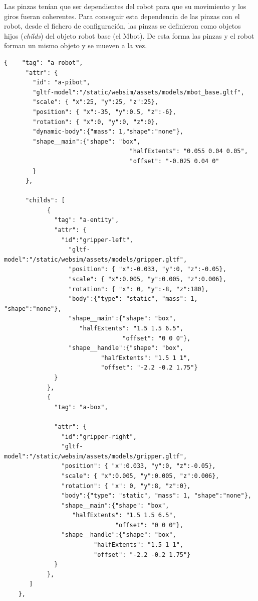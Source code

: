 Las pinzas tenían que ser dependientes del robot para que su movimiento y los giros fueran coherentes. 
Para conseguir esta dependencia de las pinzas con el robot, desde el fichero de configuración, las pinzas se definieron como objetos hijos (\textit{childs}) del objeto robot base (el Mbot). De esta forma las pinzas y el robot forman un mismo objeto y se mueven a la vez.

\begin{lstlisting}
{    "tag": "a-robot",
      "attr": {
        "id": "a-pibot",
        "gltf-model":"/static/websim/assets/models/mbot_base.gltf",
        "scale": { "x":25, "y":25, "z":25},
        "position": { "x":-35, "y":0.5, "z":-6},
        "rotation": { "x":0, "y":0, "z":0},
        "dynamic-body":{"mass": 1,"shape":"none"},
        "shape__main":{"shape": "box",
                                   "halfExtents": "0.055 0.04 0.05",
                                   "offset": "-0.025 0.04 0"
        }
      },
      
      "childs": [
            {
              "tag": "a-entity",
              "attr": {
                "id":"gripper-left",
		          "gltf-model":"/static/websim/assets/models/gripper.gltf",
                  "position": { "x":-0.033, "y":0, "z":-0.05},
                  "scale": { "x":0.005, "y":0.005, "z":0.006},
                  "rotation": { "x": 0, "y":-8, "z":180},
                  "body":{"type": "static", "mass": 1, "shape":"none"},
                  "shape__main":{"shape": "box",
                     "halfExtents": "1.5 1.5 6.5",
                                 "offset": "0 0 0"},
                  "shape__handle":{"shape": "box",
                           "halfExtents": "1.5 1 1",
                           "offset": "-2.2 -0.2 1.75"}
              }
            },
            {
              "tag": "a-box",

              "attr": {
                "id":"gripper-right",
		        "gltf-model":"/static/websim/assets/models/gripper.gltf",
                "position": { "x":0.033, "y":0, "z":-0.05},
                "scale": { "x":0.005, "y":0.005, "z":0.006},
                "rotation": { "x": 0, "y":8, "z":0},
                "body":{"type": "static", "mass": 1, "shape":"none"},
                "shape__main":{"shape": "box",
			       "halfExtents": "1.5 1.5 6.5",
                               "offset": "0 0 0"},
		        "shape__handle":{"shape": "box",
                         "halfExtents": "1.5 1 1",
                         "offset": "-2.2 -0.2 1.75"}
              }              
            },
       ]
    },
\end{lstlisting}

